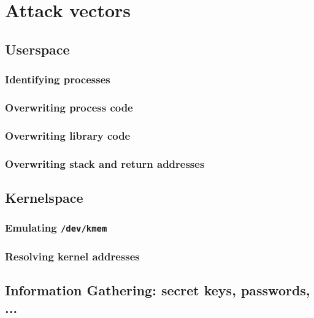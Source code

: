 %
%

\section{Attack vectors}



\subsection{Userspace}

\subsubsection{Identifying processes}

\subsubsection{Overwriting process code}

\subsubsection{Overwriting library code}

\subsubsection{Overwriting stack and return addresses}



\subsection{Kernelspace}

\subsubsection{Emulating \texttt{/dev/kmem}}

\subsubsection{Resolving kernel addresses}



\subsection{Information Gathering: secret keys, passwords, ...}

